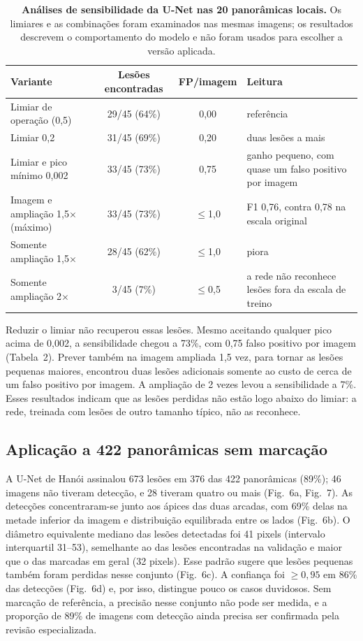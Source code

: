 \documentclass[twocolumn]{article}
\begin{document}
\begin{table}[!t]
\caption{\textbf{Análises de sensibilidade da U-Net nas 20 panorâmicas locais.} Os limiares e as combinações foram examinados nas mesmas imagens; os resultados descrevem o comportamento do modelo e não foram usados para escolher a versão aplicada.}
\centering\tablefont
\begin{tabularx}{\textwidth}{>{\RaggedRight\arraybackslash}p{52mm} c c L}
\toprule
Variante & Lesões encontradas & FP/imagem & Leitura \\
\midrule
Limiar de operação (0,5) & 29/45 (64\%) & 0,00 & referência \\
Limiar 0,2 & 31/45 (69\%) & 0,20 & duas lesões a mais \\
Limiar e pico mínimo 0,002 & 33/45 (73\%) & 0,75 & ganho pequeno, com quase um falso positivo por imagem \\
Imagem e ampliação 1,5$\times$ (máximo) & 33/45 (73\%) & $\leq$1,0 & F1 0,76, contra 0,78 na escala original \\
Somente ampliação 1,5$\times$ & 28/45 (62\%) & $\leq$1,0 & piora \\
Somente ampliação 2$\times$ & 3/45 (7\%) & $\leq$0,5 & a rede não reconhece lesões fora da escala de treino \\
\bottomrule
\end{tabularx}
\end{table}

Reduzir o limiar não recuperou essas lesões. Mesmo aceitando qualquer pico acima de 0,002, a sensibilidade chegou a 73\%, com 0,75 falso positivo por imagem (Tabela~2). Prever também na imagem ampliada 1,5 vez, para tornar as lesões pequenas maiores, encontrou duas lesões adicionais somente ao custo de cerca de um falso positivo por imagem. A ampliação de 2 vezes levou a sensibilidade a 7\%. Esses resultados indicam que as lesões perdidas não estão logo abaixo do limiar: a rede, treinada com lesões de outro tamanho típico, não as reconhece.

\subsection{Aplicação a 422 panorâmicas sem marcação}

A U-Net de Hanói assinalou 673 lesões em 376 das 422 panorâmicas (89\%); 46 imagens não tiveram detecção, e 28 tiveram quatro ou mais (Fig.~6a, Fig.~7). As detecções concentraram-se junto aos ápices das duas arcadas, com 69\% delas na metade inferior da imagem e distribuição equilibrada entre os lados (Fig.~6b). O diâmetro equivalente mediano das lesões detectadas foi 41 pixels (intervalo interquartil 31--53), semelhante ao das lesões encontradas na validação e maior que o das marcadas em geral (32 pixels). Esse padrão sugere que lesões pequenas também foram perdidas nesse conjunto (Fig.~6c). A confiança foi $\geq 0{,}95$ em 86\% das detecções (Fig.~6d) e, por isso, distingue pouco os casos duvidosos. Sem marcação de referência, a precisão nesse conjunto não pode ser medida, e a proporção de 89\% de imagens com detecção ainda precisa ser confirmada pela revisão especializada.
\end{document}

